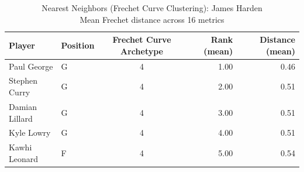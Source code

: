 \begin{table}[t]
\caption*{
{\fontsize{20}{25} Nearest Neighbors (Frechet Curve Clustering): James Harden\fontsize{12}{15}\selectfont } \\ 
{\fontsize{14}{17}\selectfont  Mean Frechet distance across 16 metrics\fontsize{12}{15}\selectfont }
} 
\fontsize{12.0pt}{14.0pt}\selectfont
\begin{tabular*}{\linewidth}{@{\extracolsep{\fill}}llcrr}
\toprule
Player & Position & Frechet Curve Archetype & Rank (mean) & Distance (mean) \\ 
\midrule\addlinespace[2.5pt]
Paul George & G & 4 & 1.00 & 0.46 \\ 
Stephen Curry & G & 4 & 2.00 & 0.51 \\ 
Damian Lillard & G & 4 & 3.00 & 0.51 \\ 
Kyle Lowry & G & 4 & 4.00 & 0.51 \\ 
Kawhi Leonard & F & 4 & 5.00 & 0.54 \\ 
\bottomrule
\end{tabular*}
\end{table}


